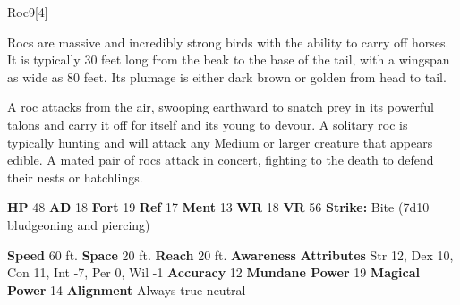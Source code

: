   
  \begin{monsection}{Roc}{9}[4]
    \vspace{-1em}\vspace{-1em}
    \vspace{0em}

    
      Rocs are massive and incredibly strong birds with the ability to carry off horses.
      It is typically 30 feet long from the beak to the base of the tail, with a wingspan as wide as 80 feet.
      Its plumage is either dark brown or golden from head to tail.

      A roc attacks from the air, swooping earthward to snatch prey in its powerful talons and carry it off for itself and its young to devour.
      A solitary roc is typically hunting and will attack any Medium or larger creature that appears edible.
      A mated pair of rocs attack in concert, fighting to the death to defend their nests or hatchlings.
    
    

    \begin{spellcontent}
      \begin{spelltargetinginfo}
        \pari \textbf{HP} 48 \monsep
          \textbf{AD} 18 \monsep
          \textbf{Fort} 19 \monsep
          \textbf{Ref} 17 \monsep
          \textbf{Ment} 13
        \pari \textbf{WR} 18 \monsep
        \textbf{VR} 56
        \pari \textbf{Strike:}
            Bite  (7d10 bludgeoning and piercing)
      \end{spelltargetinginfo}
    \end{spellcontent}
    \begin{monsterfooter}
      \pari \textbf{Speed} 60 ft. \monsep
        \textbf{Space} 20 ft. \monsep
        \textbf{Reach} 20 ft.
      \pari \textbf{Awareness} 
      \pari \textbf{Attributes}
        Str 12, Dex 10,
        Con 11, Int -7,
        Per 0, Wil -1
      \pari \textbf{Accuracy} 12 \monsep
        \textbf{Mundane Power} 19 \monsep
      \textbf{Magical Power} 14
      \pari \textbf{Alignment} Always true neutral
    \end{monsterfooter}
  \end{monsection}
  
